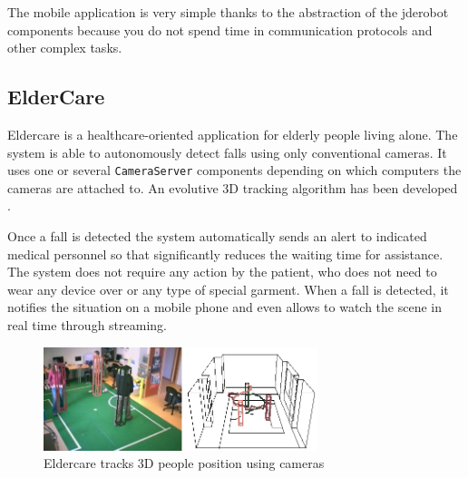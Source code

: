 \documentclass[twocolumn]{svjour3}          %
\begin{document}
The mobile application is very simple thanks to the abstraction of the
jderobot components because you do not spend time in communication
protocols and other complex tasks. 





\subsection{ElderCare}

Eldercare is a healthcare-oriented application for elderly people living alone. The system is able to autonomously detect falls using only conventional cameras. It uses one or several \texttt{CameraServer} components depending on which computers the cameras are attached to. An evolutive 3D tracking algorithm has been developed \cite{canas2011}.

Once a fall is detected the system automatically sends an alert to indicated medical personnel so that significantly reduces the waiting time for assistance. The system does not require any action by the patient, who does not need to wear any device over or any type of special garment. 
When a fall is detected, it notifies the situation on a mobile phone and even allows to watch the scene in real time through streaming.

\begin{figure}
\begin{center}
\includegraphics[width=8cm]{figs/eldercare.png}
\caption{Eldercare tracks 3D people position using cameras}
\end{center}
\label{fig:eldercare}
\end{figure}
\end{document}

